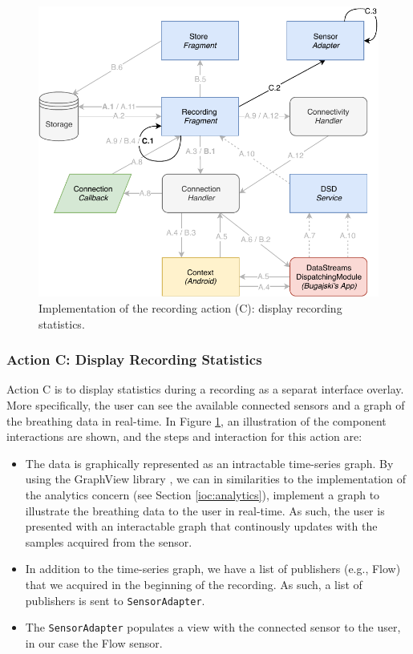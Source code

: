 \begin{figure}[!h]
    \centering
    \includegraphics[scale=0.7]{images/Recording_ImpC.pdf}
    \caption{Implementation of the recording action (C): display recording statistics.}
    \label{fig:impl_recordingC}
\end{figure}


\subsubsection{Action C: Display Recording Statistics}
Action C is to display statistics during a recording as a separat interface overlay. More specifically, the user can see the available connected sensors and a graph of the breathing data in real-time. In Figure \ref{fig:impl_recordingC}, an illustration of the component interactions are shown, and the steps and interaction for this action are: 


\begin{itemize}
    \item[C.1] The data is graphically represented as an intractable time-series graph. By using the GraphView library \cite{androidgraph}, we can in similarities to the implementation of the analytics concern (see Section \ref{ioc:analytics}), implement a graph to illustrate the breathing data to the user in real-time. As such, the user is presented with an interactable graph that continously updates with the samples acquired from the sensor.
    \item[C.2] In addition to the time-series graph, we have a list of publishers (e.g., Flow) that we acquired in the beginning of the recording. As such, a list of publishers is sent to \verb|SensorAdapter|. 
    \item[C.3] The \verb|SensorAdapter| populates a view with the connected sensor to the user, in our case the Flow sensor. 
\end{itemize}


